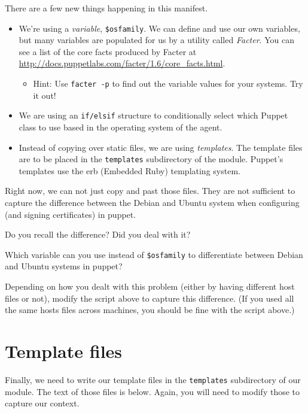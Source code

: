 \documentclass{article}   	%
\begin{document}

There are a few new things happening in this manifest.
\begin{itemize}
  \item We're using a \emph{variable}, \texttt{\$osfamily}.  We can define and use our own variables, but many variables are populated for us by a utility called \emph{Facter}.  You can see a list of the core facts produced by Facter at \\ 
  \url{http://docs.puppetlabs.com/facter/1.6/core_facts.html}.
  \begin{itemize}
  \item Hint: Use {\tt facter -p} to find out the variable values for your systems. Try it out!
  \end{itemize}
  \item We are using an \texttt{if/elsif} structure to conditionally select which Puppet class to use based in the operating system of the agent.
  \item Instead of copying over static files, we are using \emph{templates}.  The template files are to be placed in the \texttt{templates} subdirectory of the module.  Puppet's templates use the erb (Embedded Ruby) templating system.
\end{itemize}

Right now, we can not just copy and past those files. They are not sufficient to capture the difference between the Debian and Ubuntu system when configuring (and signing certificates) in puppet.

Do you recall the difference? Did you deal with it?

\vspace{0.5cm}

Which variable can you use instead of {\tt \$osfamily} to differentiate between Debian and Ubuntu systems in puppet?

Depending on how you dealt with this problem (either by having different host files or not), modify the script above to capture this difference. (If you used all the same hosts files across machines, you should be fine with the script above.)


\section{Template files}
Finally, we need to write our template files in the \texttt{templates} subdirectory of our module.  The text of those files is below. Again, you will need to modify those to capture our context.
\end{document}
